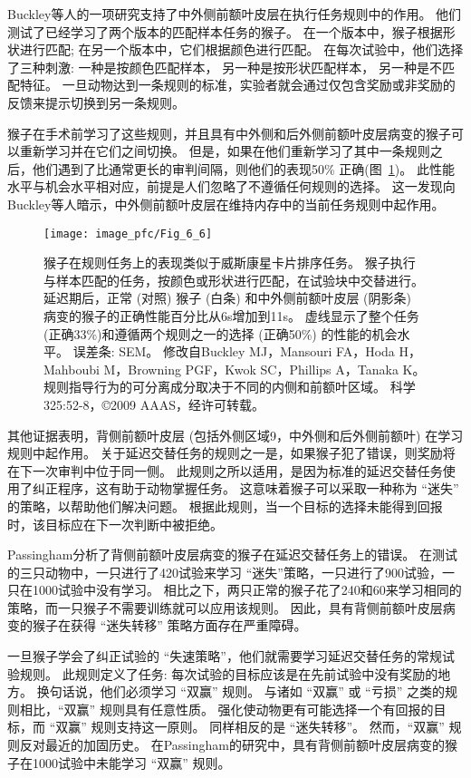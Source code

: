 Buckley等人\cite{buckley2009dissociable}的一项研究支持了中外侧前额叶皮层在执行任务规则中的作用。
他们测试了已经学习了两个版本的匹配样本任务的猴子。
在一个版本中，猴子根据形状进行匹配; 
在另一个版本中，它们根据颜色进行匹配。
在每次试验中，他们选择了三种刺激: 
一种是按颜色匹配样本，
另一种是按形状匹配样本，
另一种是不匹配特征。
一旦动物达到一条规则的标准，实验者就会通过仅包含奖励或非奖励的反馈来提示切换到另一条规则。


猴子在手术前学习了这些规则，并且具有中外侧和后外侧前额叶皮层病变的猴子可以重新学习并在它们之间切换。
但是，如果在他们重新学习了其中一条规则之后，他们遇到了比通常更长的审判间隔，则他们的表现50\% 正确\cite{buckley2009dissociable}(图~\ref{fig:6_6})。
此性能水平与机会水平相对应，前提是人们忽略了不遵循任何规则的选择。
这一发现向Buckley等人暗示，中外侧前额叶皮层在维持内存中的当前任务规则中起作用。


\begin{figure}
	\centering
	\texttt{[image: image\_pfc/Fig\_6\_6]}
	\caption{猴子在规则任务上的表现类似于威斯康星卡片排序任务。
		猴子执行与样本匹配的任务，按颜色或形状进行匹配，在试验块中交替进行。
		延迟期后，正常 (对照) 猴子 (白条) 和中外侧前额叶皮层 (阴影条) 病变的猴子的正确性能百分比从6s增加到11s。
		虚线显示了整个任务 (正确33\%)和遵循两个规则之一的选择 (正确50\%) 的性能的机会水平。
		误差条: SEM。
		修改自Buckley MJ，Mansouri FA，Hoda H，Mahboubi M，Browning PGF，Kwok SC，Phillips A，Tanaka K。
		规则指导行为的可分离成分取决于不同的内侧和前额叶区域。
		科学325:52-8，©2009 AAAS，经许可转载。}
	\label{fig:6_6}
\end{figure}


其他证据表明，背侧前额叶皮层 (包括外侧区域9，中外侧和后外侧前额叶) 在学习规则中起作用。
关于延迟交替任务的规则之一是，如果猴子犯了错误，则奖励将在下一次审判中位于同一侧。
此规则之所以适用，是因为标准的延迟交替任务使用了纠正程序，这有助于动物掌握任务。
这意味着猴子可以采取一种称为 “迷失” 的策略，以帮助他们解决问题。
根据此规则，当一个目标的选择未能得到回报时，该目标应在下一次判断中被拒绝。


Passingham\cite{passingham1975delayed}分析了背侧前额叶皮层病变的猴子在延迟交替任务上的错误。
在测试的三只动物中，一只进行了420试验来学习 “迷失”策略，一只进行了900试验，一只在1000试验中没有学习。
相比之下，两只正常的猴子花了240和60来学习相同的策略，而一只猴子不需要训练就可以应用该规则。
因此，具有背侧前额叶皮层病变的猴子在获得 “迷失转移” 策略方面存在严重障碍。


一旦猴子学会了纠正试验的 “失速策略”，他们就需要学习延迟交替任务的常规试验规则。
此规则定义了任务: 每次试验的目标应该是在先前试验中没有奖励的地方。
换句话说，他们必须学习 “双赢” 规则。
与诸如 “双赢” 或 “亏损” 之类的规则相比，“双赢” 规则具有任意性质。
强化使动物更有可能选择一个有回报的目标，而 “双赢” 规则支持这一原则。
同样相反的是 “迷失转移”。
然而，“双赢” 规则反对最近的加固历史。
在Passingham\cite{passingham1975delayed}的研究中，具有背侧前额叶皮层病变的猴子在1000试验中未能学习 “双赢” 规则。


